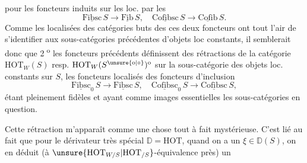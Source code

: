 pour les foncteurs induits sur les loc. par les
\[
 \underline{\mathrm{Fibsc}}\,S\longrightarrow\underline{\mathrm{Fib}}\,S,\quad
 \underline{\mathrm{Cofibsc}}\,S\longrightarrow\underline{\mathrm{Cofib}}\,S.
\]
Comme les localisées des catégories buts des ces deux foncteurs ont tout l'air de s'identifier aux sous-catégories précédentes d'objets loc constants, il semblerait donc que \textcircled{\scriptsize 2\textsuperscript{o}} les foncteurs précédents définissent
des rétractions de la catégorie $\mathrm{HOT}_W(S)$ resp. $\mathrm{HOT}_W(S^{\unsure{\mathrm o|\circ}})^{\mathrm o}$ sur la sous-catégorie des objets loc. constants sur $S$, les foncteurs localisés des foncteurs d'inclusion
\[
 \underline{\mathrm{Fibsc}}_0\,S\longrightarrow\underline{\mathrm{Fibsc}}\,S,\quad
 \underline{\mathrm{Cofibsc}}_0\,S\longrightarrow\underline{\mathrm{Cofibsc}}\,S,
\]
étant pleinement fidèles et ayant comme images essentielles les sous-catégories en question.

Cette rétraction m'apparaît comme une chose tout à fait mystérieuse.  C'est lié au fait que pour le dérivateur très spécial $\mathbb D=\mathrm{HOT}$,
quand on a un $\xi\in\mathbb D(S)$, on en déduit  (à $\unsure{\mathrm{HOT}_{W/S}|\mathrm{HOT}_{/S}}$-équivalence près) un \deleted{$\unsure{\xi}$}   
